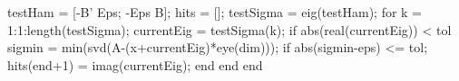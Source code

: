 testHam = [-B' Eps; -Eps B];
hits = [];
testSigma = eig(testHam);
for k = 1:1:length(testSigma);
    currentEig = testSigma(k);
    if abs(real(currentEig)) < tol 
        sigmin = min(svd(A-(x+currentEig)*eye(dim)));
        if abs(sigmin-eps) <= tol;
            hits(end+1) = imag(currentEig);
        end
    end
end
